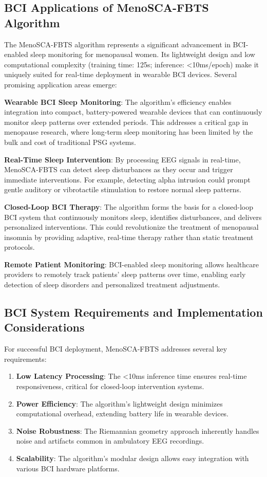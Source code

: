 \documentclass[a4paper,fleqn]{cas-dc}
\begin{document}
\subsection{BCI Applications of MenoSCA-FBTS Algorithm}

The MenoSCA-FBTS algorithm represents a significant advancement in BCI-enabled sleep monitoring for menopausal women. Its lightweight design and low computational complexity (training time: 125s; inference: <10ms/epoch) make it uniquely suited for real-time deployment in wearable BCI devices. Several promising application areas emerge:

\textbf{Wearable BCI Sleep Monitoring}: The algorithm's efficiency enables integration into compact, battery-powered wearable devices that can continuously monitor sleep patterns over extended periods. This addresses a critical gap in menopause research, where long-term sleep monitoring has been limited by the bulk and cost of traditional PSG systems.

\textbf{Real-Time Sleep Intervention}: By processing EEG signals in real-time, MenoSCA-FBTS can detect sleep disturbances as they occur and trigger immediate interventions. For example, detecting alpha intrusion could prompt gentle auditory or vibrotactile stimulation to restore normal sleep patterns.

\textbf{Closed-Loop BCI Therapy}: The algorithm forms the basis for a closed-loop BCI system that continuously monitors sleep, identifies disturbances, and delivers personalized interventions. This could revolutionize the treatment of menopausal insomnia by providing adaptive, real-time therapy rather than static treatment protocols.

\textbf{Remote Patient Monitoring}: BCI-enabled sleep monitoring allows healthcare providers to remotely track patients' sleep patterns over time, enabling early detection of sleep disorders and personalized treatment adjustments.

\subsection{BCI System Requirements and Implementation Considerations}

For successful BCI deployment, MenoSCA-FBTS addresses several key requirements:

\begin{enumerate}
\item \textbf{Low Latency Processing}: The <10ms inference time ensures real-time responsiveness, critical for closed-loop intervention systems.
\item \textbf{Power Efficiency}: The algorithm's lightweight design minimizes computational overhead, extending battery life in wearable devices.
\item \textbf{Noise Robustness}: The Riemannian geometry approach inherently handles noise and artifacts common in ambulatory EEG recordings.
\item \textbf{Scalability}: The algorithm's modular design allows easy integration with various BCI hardware platforms.
\end{enumerate}
\end{document}
